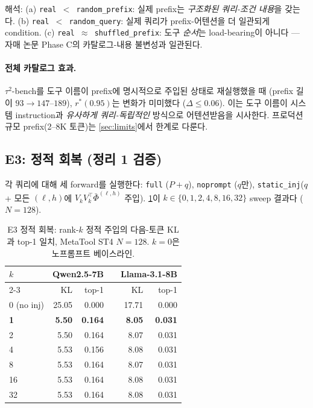 \documentclass{article}
\theoremstyle{definition}
\newcommand{\bphi}{\bar{\Phi}}
\begin{document}
해석: (a) \texttt{real $<$ random\_prefix}: 실제 prefix는 \emph{구조화된 쿼리-조건 내용}을 갖는다. (b) \texttt{real $<$ random\_query}: 실제 쿼리가 prefix-어텐션을 더 일관되게 condition. (c) \texttt{real $\approx$ shuffled\_prefix}: 도구 \emph{순서}는 load-bearing이 아니다 --- 자매 논문 Phase C의 카탈로그-내용 불변성과 일관된다.

\paragraph{전체 카탈로그 효과.}
$\tau^2$-bench를 도구 이름이 prefix에 명시적으로 주입된 상태로 재실행했을 때 (prefix 길이 $93\to147$--$189$), $r^*(0.95)$는 변화가 미미했다 ($\Delta \le 0.06$). 이는 도구 이름이 시스템 instruction과 \emph{유사하게 쿼리-독립적인} 방식으로 어텐션받음을 시사한다. 프로덕션 규모 prefix(2--8K 토큰)는 \cref{sec:limits}에서 한계로 다룬다.

\subsection{E3: 정적 회복 (정리 1 검증)}
\label{sec:results-static}

각 쿼리에 대해 세 forward를 실행한다: \texttt{full} ($P + q$), \texttt{noprompt} ($q$만), \texttt{static\_inj}($q$ + 모든 $(\ell,h)$에 $V_k V_k^\top \bphi^{(\ell,h)}$ 주입). \cref{tab:e3-static}이 $k \in \{0,1,2,4,8,16,32\}$ sweep 결과다 ($N{=}128$).

\begin{table}[h]
\centering
\caption{E3 정적 회복: rank-$k$ 정적 주입의 다음-토큰 KL과 top-1 일치, MetaTool ST4 $N{=}128$. $k=0$은 노프롬프트 베이스라인.}
\label{tab:e3-static}
\small
\begin{tabular}{lrrrrr}
\toprule
$k$ & \multicolumn{2}{c}{Qwen2.5-7B} & & \multicolumn{2}{c}{Llama-3.1-8B} \\
\cmidrule{2-3} \cmidrule{5-6}
 & KL & top-1 & & KL & top-1 \\
\midrule
0 (no inj) & 25.05 & 0.000 & & 17.71 & 0.000 \\
\textbf{1} & \textbf{5.50} & \textbf{0.164} & & \textbf{8.05} & \textbf{0.031} \\
2 & 5.50 & 0.164 & & 8.07 & 0.031 \\
4 & 5.53 & 0.156 & & 8.08 & 0.031 \\
8 & 5.53 & 0.164 & & 8.07 & 0.031 \\
16 & 5.53 & 0.164 & & 8.08 & 0.031 \\
32 & 5.53 & 0.164 & & 8.08 & 0.031 \\
\bottomrule
\end{tabular}
\end{table}
\end{document}
